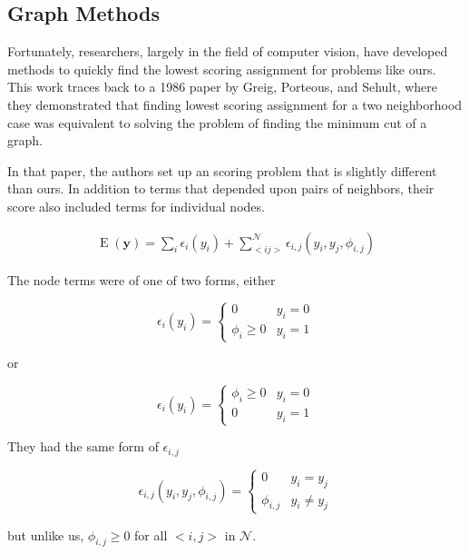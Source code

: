 \subsection*{Graph Methods}
Fortunately, researchers, largely in the field of computer vision,
have developed methods to quickly find the lowest scoring assignment
for problems like ours. This work traces back to a 1986 paper by
Greig, Porteous, and Sehult, where they demonstrated that finding
lowest scoring assignment for a two neighborhood case was equivalent
to solving the problem of finding the minimum cut of a
graph.\cite{greig_exact_1989}

In that paper, the authors set up an scoring problem that is slightly
different than ours. In addition to terms that depended upon pairs of
neighbors, their score also included terms for individual nodes.

\begin{align}
\operatorname{E}(\mathbf{y}) = \sum_i\epsilon_i(y_i) + \sum_{<i
  j>}^{\mathcal{N}}\epsilon_{i,j}(y_i,y_j,\phi_{i,j})
\end{align}

\noindent
The node terms were of one of two forms, either

\begin{equation}
\epsilon_{i}(y_i) = \begin{cases}
  0 &y_i = 0 \\
  \phi_{i} \geq 0 &y_i = 1
\end{cases}
\end{equation}

\noindent
or 

\begin{equation}
\epsilon_{i}(y_i) = \begin{cases}
  \phi_{i} \geq 0 &y_i = 0 \\
  0 &y_i = 1
\end{cases}
\end{equation}

\noindent
They had the same form of $\epsilon_{i,j}$

\begin{equation}
\epsilon_{i,j}(y_i,y_j,\phi_{i,j}) = \begin{cases}
  0 &y_i = y_j \\
  \phi_{i,j} &y_i \neq y_j
\end{cases}
\end{equation}

\noindent
but unlike us, $\phi_{i,j} \geq 0$ for all $<i, j>$ in $\mathcal{N}$. 

